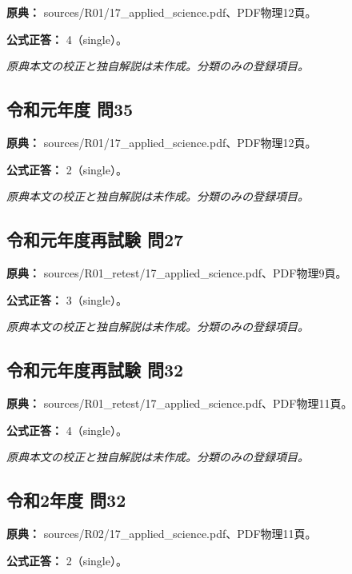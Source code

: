 \noindent\textbf{原典：} sources/R01/17\_applied\_science.pdf、PDF物理12頁。

\textbf{公式正答：} 4（single）。

\par\textit{原典本文の校正と独自解説は未作成。分類のみの登録項目。}

\subsection{令和元年度 問35}
\label{q:r01-reg-applied-35}

\noindent\textbf{原典：} sources/R01/17\_applied\_science.pdf、PDF物理12頁。

\textbf{公式正答：} 2（single）。

\par\textit{原典本文の校正と独自解説は未作成。分類のみの登録項目。}

\subsection{令和元年度再試験 問27}
\label{q:r01-ret-applied-27}

\noindent\textbf{原典：} sources/R01\_retest/17\_applied\_science.pdf、PDF物理9頁。

\textbf{公式正答：} 3（single）。

\par\textit{原典本文の校正と独自解説は未作成。分類のみの登録項目。}

\subsection{令和元年度再試験 問32}
\label{q:r01-ret-applied-32}

\noindent\textbf{原典：} sources/R01\_retest/17\_applied\_science.pdf、PDF物理11頁。

\textbf{公式正答：} 4（single）。

\par\textit{原典本文の校正と独自解説は未作成。分類のみの登録項目。}

\subsection{令和2年度 問32}
\label{q:r02-reg-applied-32}

\noindent\textbf{原典：} sources/R02/17\_applied\_science.pdf、PDF物理11頁。

\textbf{公式正答：} 2（single）。

